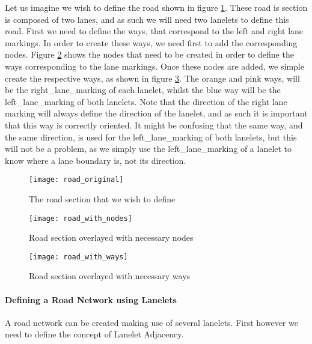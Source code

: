 Let us imagine we wish to define the road shown in figure \ref{fig:road_to_define}. These road is section is composed of two lanes, and as such we will need two lanelets to define this road. First we need to define the ways, that correspond to the left and right lane markings. In order to create these ways, we need first to add the corresponding nodes. Figure \ref{fig:road_to_define_with_nodes} shows the nodes that need to be created in order to define the ways corresponding to the lane markings. Once these nodes are added, we simple create the respective ways, as shown in figure \ref{fig:road_to_define_with_ways}. The orange and pink ways, will be the right\_lane\_marking of each lanelet, whilst the blue way will be the left\_lane\_marking of both lanelets. Note that the direction of the right lane marking will always define the direction of the lanelet, and as such it is important that this way is correctly oriented. It might be confusing that the same way, and the same direction, is used for the left\_lane\_marking of both lanelets, but this will not be a problem, as we simply use the left\_lane\_marking of a lanelet to know where a lane boundary is, not its direction.

\begin{figure}[h!]
  \centering
    \texttt{[image: road\_original]}
    \caption{The road section that we wish to define \label{fig:road_to_define} }
\end{figure}

\begin{figure}[h!]
    \centering
    \texttt{[image: road\_with\_nodes]}
    \caption{Road section overlayed with necessary nodes \label{fig:road_to_define_with_nodes} }
\end{figure}

\begin{figure}[h!]
    \centering
    \texttt{[image: road\_with\_ways]}
    \caption{Road section overlayed with necessary ways \label{fig:road_to_define_with_ways} }
\end{figure}

\paragraph{Defining a Road Network using Lanelets}

A road network can be created making use of several lanelets. First however we need to define the concept of Lanelet Adjacency.

